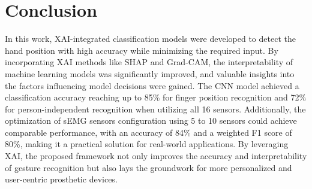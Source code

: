 \documentclass[preprint,12pt]{elsarticle}
\begin{document}
\section{Conclusion}

In this work, XAI-integrated classification models were developed to detect the hand position with high accuracy while minimizing the required input. By incorporating XAI methods like SHAP and Grad-CAM, the interpretability of machine learning models was significantly improved, and valuable insights into the factors influencing model decisions were gained. The CNN model achieved a classification accuracy reaching up to 85\% for finger position recognition and 72\% for person-independent recognition when utilizing all 16 sensors. Additionally, the optimization of sEMG sensors configuration using 5 to 10 sensors could achieve comparable performance, with an accuracy of 84\% and a weighted F1 score of 80\%, making it a practical solution for real-world applications. By leveraging XAI, the proposed framework not only improves the accuracy and interpretability of gesture recognition but also lays the groundwork for more personalized and user-centric prosthetic devices.


\end{document}
